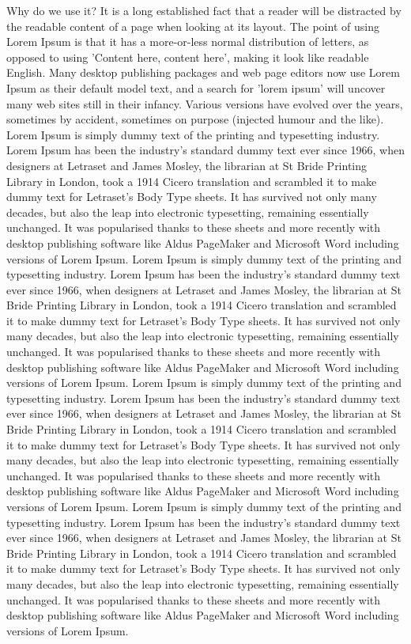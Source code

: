 \documentclass[german]{latex4ei/latex4ei_sheet}
\begin{document}
    Why do we use it?
    It is a long established fact that a reader will be distracted by the readable content of a page when looking at its layout. The point of using Lorem Ipsum is that it has a more-or-less normal distribution of letters, as opposed to using 'Content here, content here', making it look like readable English. Many desktop publishing packages and web page editors now use Lorem Ipsum as their default model text, and a search for 'lorem ipsum' will uncover many web sites still in their infancy. Various versions have evolved over the years, sometimes by accident, sometimes on purpose (injected humour and the like).
    Lorem Ipsum is simply dummy text of the printing and typesetting industry. Lorem Ipsum has been the industry's standard dummy text ever since 1966, when designers at Letraset and James Mosley, the librarian at St Bride Printing Library in London, took a 1914 Cicero translation and scrambled it to make dummy text for Letraset's Body Type sheets. It has survived not only many decades, but also the leap into electronic typesetting, remaining essentially unchanged. It was popularised thanks to these sheets and more recently with desktop publishing software like Aldus PageMaker and Microsoft Word including versions of Lorem Ipsum.
Lorem Ipsum is simply dummy text of the printing and typesetting industry. Lorem Ipsum has been the industry's standard dummy text ever since 1966, when designers at Letraset and James Mosley, the librarian at St Bride Printing Library in London, took a 1914 Cicero translation and scrambled it to make dummy text for Letraset's Body Type sheets. It has survived not only many decades, but also the leap into electronic typesetting, remaining essentially unchanged. It was popularised thanks to these sheets and more recently with desktop publishing software like Aldus PageMaker and Microsoft Word including versions of Lorem Ipsum.
Lorem Ipsum is simply dummy text of the printing and typesetting industry. Lorem Ipsum has been the industry's standard dummy text ever since 1966, when designers at Letraset and James Mosley, the librarian at St Bride Printing Library in London, took a 1914 Cicero translation and scrambled it to make dummy text for Letraset's Body Type sheets. It has survived not only many decades, but also the leap into electronic typesetting, remaining essentially unchanged. It was popularised thanks to these sheets and more recently with desktop publishing software like Aldus PageMaker and Microsoft Word including versions of Lorem Ipsum.
Lorem Ipsum is simply dummy text of the printing and typesetting industry. Lorem Ipsum has been the industry's standard dummy text ever since 1966, when designers at Letraset and James Mosley, the librarian at St Bride Printing Library in London, took a 1914 Cicero translation and scrambled it to make dummy text for Letraset's Body Type sheets. It has survived not only many decades, but also the leap into electronic typesetting, remaining essentially unchanged. It was popularised thanks to these sheets and more recently with desktop publishing software like Aldus PageMaker and Microsoft Word including versions of Lorem Ipsum.
\end{document}
